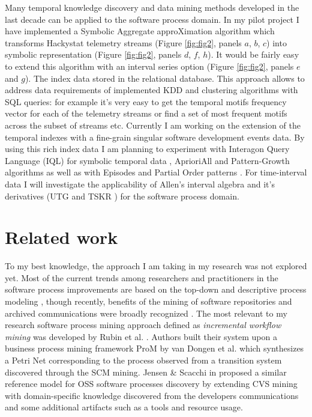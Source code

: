 \documentclass[11pt,oneside]{article}
\begin{document}
Many temporal knowledge discovery and data mining methods developed in the last decade can be applied to the software process domain. In my pilot project I have implemented a Symbolic Aggregate approXimation algorithm \cite{citeulike:2821475} which transforms Hackystat telemetry streams (Figure \ref{fig:fig2}, panels $a$, $b$, $c$) into symbolic representation (Figure \ref{fig:fig2}, panels $d$, $f$, $h$). It would be fairly easy to extend this algorithm with an interval series option (Figure \ref{fig:fig2}, panels $e$ and $g$). The index data stored in the relational database. This approach allows to address data requirements of implemented KDD and clustering algorithms with SQL queries: for example it's very easy to get the temporal motifs frequency vector for each of the telemetry streams or find a set of most frequent motifs across the subset of streams etc. Currently I am working on the extension of the temporal indexes with a fine-grain singular software development events data. By using this rich index data I am planning to experiment with Interagon Query Language (IQL) for symbolic temporal data \cite{citeulike:5043086}, AprioriAll \cite{citeulike:775528} and Pattern-Growth algorithms \cite{citeulike:5043097} as well as with Episodes \cite{citeulike:5043099} and Partial Order patterns \cite{citeulike:5043101}. For time-interval data I will investigate the applicability of Allen's interval algebra \cite{citeulike:191348} and it's derivatives (UTG \cite{citeulike:5043086} and TSKR \cite{citeulike:3978076}) for the software process domain. 

\section{Related work}
To my best knowledge, the approach I am taking in my research was not explored yet. Most of the current trends among researchers and practitioners in the software process improvements are based on the top-down and descriptive process modeling \cite{citeulike:5043670}, though recently, benefits of the mining of software repositories and archived communications were broadly recognized \cite{citeulike:5043676}. The most relevant to my research software process mining approach defined as \textit{incremental workflow mining} was developed by Rubin et al. \cite{citeulike:1885717}. Authors built their system upon a business process mining framework ProM by van Dongen et al. \cite{citeulike:5043673} which synthesizes a Petri Net corresponding to the process observed from a transition system discovered through the SCM mining. Jensen \& Scacchi in \cite{citeulike:5043664} proposed a similar reference model for OSS software processes discovery by extending CVS mining with domain-specific knowledge discovered from the developers communications and some additional artifacts such as a tools and resource usage. 
\end{document}
